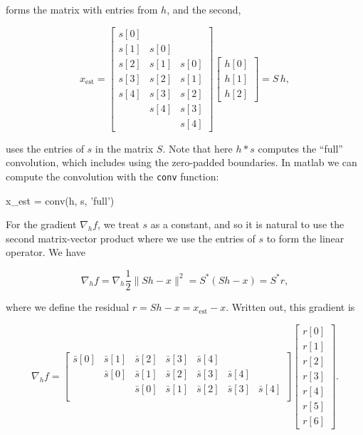 \documentclass[journal]{IEEEtran}
\begin{document}
\noindent forms the matrix with entries from $h$, and the second,

\[ x_\text{est} = \begin{bmatrix} s[0]\\s[1]&s[0]\\s[2]&s[1]&s[0]\\s[3]&s[2]&s[1]\\s[4]&s[3]&s[2]\\&s[4]&s[3]\\&&s[4]\end{bmatrix}\begin{bmatrix}h[0]\\h[1]\\h[2]\end{bmatrix}
= S\, h, \] 

\noindent uses the entries of $s$ in the matrix $S$.  Note that here $h\ast s$ computes the ``full'' convolution, which includes using the zero-padded boundaries.  In {\sc matlab} we can compute the convolution with the \verb|conv| function:

\begin{verb}
  x_est = conv(h, s, 'full')
\end{verb}

For the gradient $\nabla_hf$, we treat $s$ as a constant, and so it is natural to use the second matrix-vector product where we use the entries of $s$ to form the linear operator.  We have

\[ \nabla_hf = \nabla_h\frac{1}{2}\|Sh-x\|^2 = S^\ast(Sh-x) = S^\ast r, \] 

\noindent where we define the residual $r=Sh-x = x_\text{est}-x$.  Written out, this gradient is

\[ \nabla_h f = \begin{bmatrix} \bar{s}[0]&\bar{s}[1]&\bar{s}[2]&\bar{s}[3]&\bar{s}[4]\\&\bar{s}[0]&\bar{s}[1]&\bar{s}[2]&\bar{s}[3]&\bar{s}[4]\\&&\bar{s}[0]&\bar{s}[1]&\bar{s}[2]&\bar{s}[3]&\bar{s}[4]\\\end{bmatrix}\begin{bmatrix}r[0]\\r[1]\\r[2]\\r[3]\\r[4]\\r[5]\\r[6]\end{bmatrix}. \] 
\end{document}
